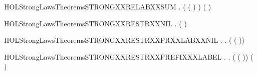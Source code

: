 \begin{SaveVerbatim}{HOLStrongLawsTheoremsSTRONGXXRELABXXSUM}
\HOLTokenTurnstile{} \HOLSymConst{\HOLTokenForall{}}  .
        ( ( \HOLSymConst{\ensuremath{+}} ) )
         (   \HOLSymConst{\ensuremath{+}}   )
\end{SaveVerbatim}
\newcommand{\HOLStrongLawsTheoremsSTRONGXXRELABXXSUM}{\UseVerbatim{HOLStrongLawsTheoremsSTRONGXXRELABXXSUM}}
\begin{SaveVerbatim}{HOLStrongLawsTheoremsSTRONGXXRESTRXXNIL}
\HOLTokenTurnstile{} \HOLSymConst{\HOLTokenForall{}}.  (\HOLConst{\ensuremath{\nu}}  ) 
\end{SaveVerbatim}
\newcommand{\HOLStrongLawsTheoremsSTRONGXXRESTRXXNIL}{\UseVerbatim{HOLStrongLawsTheoremsSTRONGXXRESTRXXNIL}}
\begin{SaveVerbatim}{HOLStrongLawsTheoremsSTRONGXXRESTRXXPRXXLABXXNIL}
\HOLTokenTurnstile{} \HOLSymConst{\HOLTokenForall{}} .
        \HOLConst{\HOLTokenIn{}}  \HOLSymConst{\HOLTokenDisj{}}   \HOLConst{\HOLTokenIn{}}  \HOLSymConst{\HOLTokenImp{}}
       \HOLSymConst{\HOLTokenForall{}}.  (\HOLConst{\ensuremath{\nu}}  ( )) 
\end{SaveVerbatim}
\newcommand{\HOLStrongLawsTheoremsSTRONGXXRESTRXXPRXXLABXXNIL}{\UseVerbatim{HOLStrongLawsTheoremsSTRONGXXRESTRXXPRXXLABXXNIL}}
\begin{SaveVerbatim}{HOLStrongLawsTheoremsSTRONGXXRESTRXXPREFIXXXLABEL}
\HOLTokenTurnstile{} \HOLSymConst{\HOLTokenForall{}} .
        \HOLConst{\HOLTokenNotIn{}}  \HOLSymConst{\HOLTokenConj{}}   \HOLConst{\HOLTokenNotIn{}}  \HOLSymConst{\HOLTokenImp{}}
       \HOLSymConst{\HOLTokenForall{}}.  (\HOLConst{\ensuremath{\nu}}  ( )) ( \HOLConst{\ensuremath{\nu}}  )
\end{SaveVerbatim}
